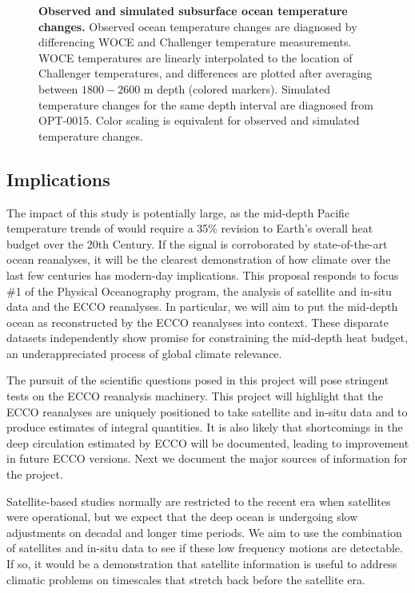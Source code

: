 \documentclass[authoryear,round,12pt]{article}
\begin{document}
\begin{figure}[htbp]
\label{fig:model_data}
\begin{center}
\caption{{\bf Observed and simulated subsurface ocean temperature changes.} Observed ocean temperature changes are diagnosed by differencing WOCE and Challenger temperature measurements. WOCE temperatures are linearly interpolated to the location of Challenger temperatures, and differences are plotted after averaging between $1800-2600$ m depth (colored markers).  Simulated temperature changes for the same depth interval are diagnosed from OPT-0015. Color scaling is equivalent for observed and simulated temperature changes.}
\end{center} 
\end{figure}

\subsection{Implications}
\label{sec:implications}

The impact of this study is potentially large, as the mid-depth
Pacific temperature trends of \citet{Gebbie-Huybers-2019:Little} would
require a 35\% revision to Earth's overall heat budget over the 20th
Century. If the signal is corroborated by state-of-the-art ocean
reanalyses, it will be the clearest demonstration of how climate over
the last few centuries has modern-day implications. This proposal
responds to focus \#1 of the Physical Oceanography program, the
analysis of satellite and in-situ data and the ECCO reanalyses. In
particular, we will aim to put the mid-depth ocean as reconstructed by
the ECCO reanalyses into context. These disparate datasets
independently show promise for constraining the mid-depth heat budget,
an underappreciated process of global climate relevance.

The pursuit of the scientific questions posed in this project will
pose stringent tests on the ECCO reanalysis machinery. This project
will highlight that the ECCO reanalyses are uniquely positioned to
take satellite and in-situ data and to produce estimates of integral
quantities. It is also likely that shortcomings in the deep
circulation estimated by ECCO will be documented, leading to
improvement in future ECCO versions. Next we document the major
sources of information for the project.

Satellite-based studies normally are restricted to the recent era when
satellites were operational, but we expect that the deep ocean is
undergoing slow adjustments on decadal and longer time periods. We aim
to use the combination of satellites and in-situ data to see if these
low frequency motions are detectable. If so, it would be a
demonstration that satellite information is useful to address climatic
problems on timescales that stretch back before the satellite era.
\end{document}
